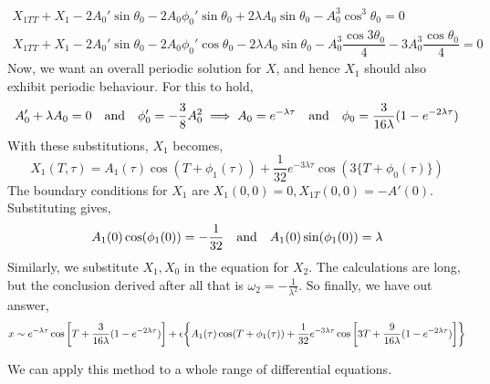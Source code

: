 \documentclass[a4paper,11pt]{article}
\begin{document}
\begin{align*}
X_{1TT} + X_1 -2 A_0'\sin \theta_0 -2 A_0 \phi_0' \sin \theta_0 + 2 \lambda A_0 \sin \theta_0 - A_0^3 \cos^3\theta_0 = 0 \\
X_{1TT} + X_1 -2 A_0'\sin \theta_0 -2 A_0 \phi_0' \cos \theta_0 - 2 \lambda A_0 \sin \theta_0 - A_0^3 \dfrac{\cos 3\theta_0}{4} - 3A_0^3 \dfrac{\cos \theta_0}{4}   = 0 
\end{align*}
Now, we want an overall periodic solution for $ X $, and hence $ X_1 $ should also exhibit periodic behaviour. For this to hold,
\begin{equation*}
A_0' + \lambda A_0 = 0 \qq{and} \phi_0' = - \dfrac{3}{8} A_0^2 \implies A_0 = e^{-\lambda \tau} \qq{and} \phi_0 = \dfrac{3}{16 \lambda} ( 1 - e^{-2 \lambda \tau})
\end{equation*}
With these substitutions, $ X_1 $ becomes,
\begin{equation*}
X_1(T,\tau) = A_1(\tau) \cos (T + \phi_1(\tau) ) + \dfrac{1}{32} e^{-3 \lambda \tau} \cos(3\{T + \phi_0(\tau)\})
\end{equation*}
The boundary conditions for $ X_1  $ are $ X_1(0,0)= 0 , X_{1T}(0,0) = - A'(0) $. Substituting gives,
\begin{equation*}
A_1(0) \cos(\phi_1(0)) = -\dfrac{1}{32} \qq{and} A_1(0) \sin(\phi_1(0)) = \lambda 
\end{equation*}
Similarly, we substitute $ X_1 , X_0 $ in the equation for $ X_2 $. The calculations are long, but the conclusion derived after all that is $ \omega_2 = -\frac{1}{\lambda^2} $. So finally, we have out answer,
\begin{equation*}
x \sim e^{-\lambda\tau} \cos\qty[T + \dfrac{3}{16 \lambda}(1- e^{-2 \lambda \tau})] + \epsilon \qty{ A_1(\tau) \cos(T + \phi_1(\tau)) + \dfrac{1}{32} e^{-3 \lambda \tau}  \cos\qty[3T + \dfrac{9}{16 \lambda}(1- e^{-2 \lambda \tau}) ]}
\end{equation*}

We can apply this method to a whole range of differential equations.
\end{document}
